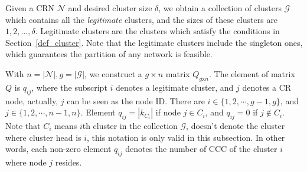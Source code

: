 \documentclass[journal,comsoc]{IEEEtran}
\theoremstyle{mytheoremstyle}
\theoremstyle{mytheoremstyle}
\theoremstyle{mytheoremstyle}
\newcommand{\ie}{i.e., }
\newcommand{\bigO}{\ensuremath{\mathcal{O}}}%
\begin{document}





Given a CRN $\mathcal{N}$ and desired cluster size $\delta$, we obtain a collection of clusters $\mathcal{G}$ which contains all the \textit{legitimate} clusters, and the sizes of these clusters are $1,2,\ldots,\delta$.
Legitimate clusters are the clusters which satisfy the conditions in Section~\ref{def_cluster}. 
Note that the legitimate clusters include the singleton ones, which guarantees the partition of any network is feasible.

With $n=|\mathcal{N}|,g=|\mathcal{G}|$, we construct a $g\times n$ matrix $Q_{g\text{x}n}$. 
The element of matrix $Q$ is $q_{ij}$, where the subscript $i$ denotes a legitimate cluster, and $j$ denotes a CR node, actually, $j$ can be seen as the node ID. 
There are $i\in \{1,2,\cdots,g-1, g\}$, and $j\in \{1,2,\cdots,n-1, n\}$.
Element $q_{ij}= |k_{C_i}|$ if node $j\in C_i$, and $q_{ij}= 0$ if $j\notin C_i$.
Note that $C_i$ means $i$th cluster in the collection $\mathcal{G}$, doesn't denote the cluster where cluster head is $i$, this notation is only valid in this subsection.
In other words, each non-zero element $q_{ij}$ denotes the number of CCC of the cluster $i$ where node $j$ resides.
\end{document}
